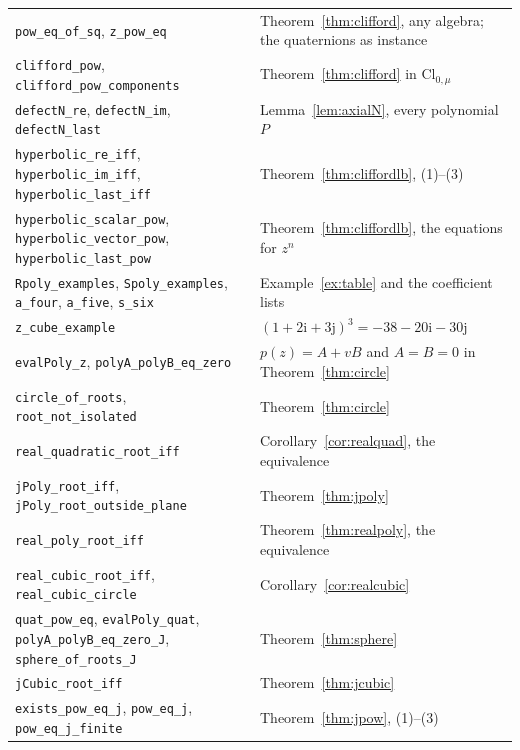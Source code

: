 \documentclass[11pt,a4paper]{article}
\newcommand{\ii}{\mathrm{i}}
\newcommand{\jj}{\mathrm{j}}
\newcommand{\lean}[1]{\texttt{#1}}
\theoremstyle{remark}
\begin{document}
{\begin{longtable}{@{}>{\raggedright\arraybackslash}p{}>{\raggedright\arraybackslash}p{}@{}}
  \lean{pow\_eq\_of\_sq}, \lean{z\_pow\_eq} & Theorem~\ref{thm:clifford}, any algebra; the quaternions as instance\\
  \lean{clifford\_pow}, \lean{clifford\_pow\_components} & Theorem~\ref{thm:clifford} in $\mathrm{Cl}_{0,\mu}$\\
  \lean{defectN\_re}, \lean{defectN\_im}, \lean{defectN\_last} & Lemma~\ref{lem:axialN}, every polynomial $P$\\
  \lean{hyperbolic\_re\_iff}, \lean{hyperbolic\_im\_iff}, \lean{hyperbolic\_last\_iff} & Theorem~\ref{thm:cliffordlb}, (1)--(3)\\
  \lean{hyperbolic\_scalar\_pow}, \lean{hyperbolic\_vector\_pow}, \lean{hyperbolic\_last\_pow} & Theorem~\ref{thm:cliffordlb}, the equations for $z^n$\\
  \lean{Rpoly\_examples}, \lean{Spoly\_examples}, \lean{a\_four}, \lean{a\_five}, \lean{s\_six} & Example~\ref{ex:table} and the coefficient lists\\
  \lean{z\_cube\_example} & $(1+2\ii+3\jj)^3=-38-20\ii-30\jj$\\
  \lean{evalPoly\_z}, \lean{polyA\_polyB\_eq\_zero} & $p(z)=A+vB$ and $A=B=0$ in Theorem~\ref{thm:circle}\\
  \lean{circle\_of\_roots}, \lean{root\_not\_isolated} & Theorem~\ref{thm:circle}\\
  \lean{real\_quadratic\_root\_iff} & Corollary~\ref{cor:realquad}, the equivalence\\
  \lean{jPoly\_root\_iff}, \lean{jPoly\_root\_outside\_plane} & Theorem~\ref{thm:jpoly}\\
  \lean{real\_poly\_root\_iff} & Theorem~\ref{thm:realpoly}, the equivalence\\
  \lean{real\_cubic\_root\_iff}, \lean{real\_cubic\_circle} & Corollary~\ref{cor:realcubic}\\
  \lean{quat\_pow\_eq}, \lean{evalPoly\_quat}, \lean{polyA\_polyB\_eq\_zero\_J}, \lean{sphere\_of\_roots\_J} & Theorem~\ref{thm:sphere}\\
  \lean{jCubic\_root\_iff} & Theorem~\ref{thm:jcubic}\\
  \lean{exists\_pow\_eq\_j}, \lean{pow\_eq\_j}, \lean{pow\_eq\_j\_finite} & Theorem~\ref{thm:jpow}, (1)--(3)
\end{longtable}}
\end{document}
